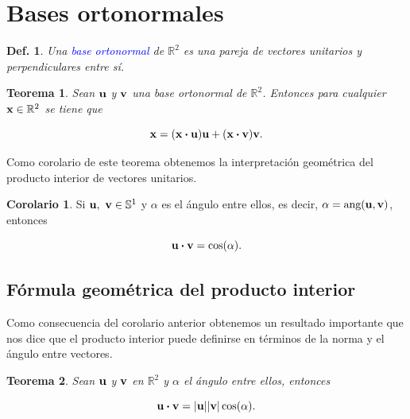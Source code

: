 \documentclass{article}
\theoremstyle{definicion}
\newtheorem{definicion}{Def.}
\theoremstyle{definition}             %
\theoremstyle{definition}             %
\theoremstyle{definition}
\theoremstyle{definition}
\theoremstyle{observacion}
\theoremstyle{definition}
\theoremstyle{plain}
\newtheorem{theorem}{Teorema}
\theoremstyle{definition}
\theoremstyle{afirmacion}
\newtheorem{corollary}{Corolario}
\theoremstyle{notation}
\theoremstyle{definition}
\begin{document}
        \section{Bases ortonormales}

        \begin{definicion}
            Una \textcolor{blue}{base ortonormal} de \(\mathbb{R}^{2}\) es una pareja de vectores unitarios y perpendiculares entre sí.
        \end{definicion}

        \begin{theorem}
            Sean \(\vb{u}\) y \(\vb{v}\) una base ortonormal de \(\mathbb{R}^{2}\).  Entonces para cualquier \(\vb{x} \in \mathbb{R}^{2}\) se tiene que

            \begin{equation*}
                \vb{x} = (\vb{x} \vdot \vb{u}) \vb{u} + (\vb{x} \vdot \vb{v}) \vb{v}.
            \end{equation*}
        \end{theorem}

        Como corolario de este teorema obtenemos la interpretación geométrica del producto interior de vectores unitarios.

        \begin{corollary}
            Si \(\vb{u},\ \vb{v} \in \mathbb{S}^{1}\) y \(\alpha\) es el ángulo entre ellos,  es decir, \(\alpha = \textrm{ang}(\vb{u}, \vb{v})\), entonces

            \begin{equation*}
                \vb{u} \vdot \vb{v} = \cos(\alpha).
            \end{equation*}
        \end{corollary}

        \subsection{Fórmula geométrica del producto interior}

        Como consecuencia del corolario anterior obtenemos un resultado importante que nos dice que el producto interior puede definirse en términos de la norma y el ángulo entre vectores.

        \begin{theorem}
            Sean \(\vb{u}\) y \(\vb{v}\) en \(\mathbb{R}^{2}\) y \(\alpha\) el ángulo entre ellos, entonces 

            \begin{equation*}
                \vb{u} \vdot \vb{v} = \abs{\vb{u}}\abs{\vb{v}}\cos(\alpha).
            \end{equation*}
        \end{theorem}
\end{document}
